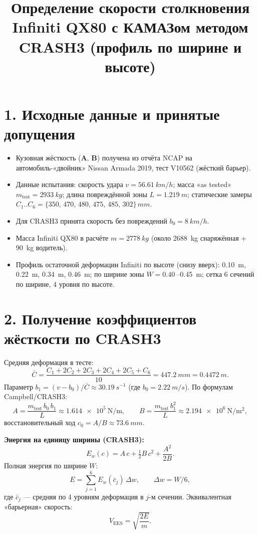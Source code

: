 \documentclass[12pt,a4paper]{article}
\title{Определение скорости столкновения Infiniti QX80 с КАМАЗом методом CRASH3 (профиль по ширине и высоте)}
\author{}
\date{}
\begin{document}
	\maketitle
	
	\section*{1. Исходные данные и принятые допущения}
	\begin{itemize}
		\item Кузовная жёсткость (\textbf{A}, \textbf{B}) получена из отчёта NCAP на автомобиль-«двойник» Nissan Armada 2019, тест V10562 (жёсткий барьер).
		\item Данные испытания: скорость удара $v=\SI{56.61}{km/h}$; масса «as tested» $m_{\text{test}}=\SI{2933}{kg}$; длина повреждённой зоны $L=\SI{1.219}{m}$; статические замеры $C_1..C_6=\{350,\,470,\,480,\,475,\,485,\,302\}\,\si{mm}$.
		\item Для CRASH3 принята скорость без повреждений $b_0=\SI{8}{km/h}$.
		\item Масса Infiniti QX80 в расчёте $m=\SI{2778}{kg}$ (около \SI{2688}{kg} снаряжённая + \SI{90}{kg} водитель).
		\item Профиль остаточной деформации Infiniti по высоте (снизу вверх): \SI{0.10}{m}, \SI{0.22}{m}, \SI{0.34}{m}, \SI{0.46}{m}; по ширине зоны $W=\SI{0.40}{}$–\SI{0.45}{m}; сетка 6 сечений по ширине, 4 уровня по высоте.
	\end{itemize}
	
	\section*{2. Получение коэффициентов жёсткости по CRASH3}
	Средняя деформация в тесте:
	\[
	\bar C=\frac{C_1+2C_2+2C_3+2C_4+2C_5+C_6}{10}=\SI{447.2}{mm}=\SI{0.4472}{m}.
	\]
	Параметр $b_1=(v-b_0)/\bar C\approx\SI{30.19}{s^{-1}}$ (где $b_0=\SI{2.22}{m/s}$). По формулам Campbell/CRASH3:
	\[
	A=\frac{m_{\text{test}}\,b_0\,b_1}{L}\approx \SI{1.614e5}{\newton\per\metre},\qquad
	B=\frac{m_{\text{test}}\,b_1^{2}}{L}\approx \SI{2.194e6}{\newton\per\metre\squared},
	\]
	восстановительный ход $c_0=A/B\approx \SI{73.6}{mm}$.
	
	\medskip
	\noindent\textbf{Энергия на единицу ширины (CRASH3):}
	\[
	E_w(c)=A\,c+\tfrac12 B\,c^2+\frac{A^2}{2B}.
	\]
	Полная энергия по ширине $W$:
	\[
	E=\sum_{j=1}^{6}E_w(\bar c_j)\,\Delta w,\qquad \Delta w=W/6,
	\]
	где $\bar c_j$ — средняя по 4 уровням деформация в $j$-м сечении.
	Эквивалентная «барьерная» скорость:
	\[
	V_{\text{EES}}=\sqrt{\frac{2E}{m}}.
	\]
	
\end{document}
